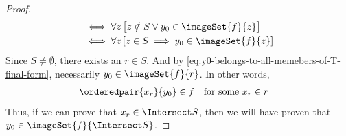 \begin{proof}
\begin{align}
        &\iff
        \forall z \, \big[ z \notin S \lor y_{0} \in \imageSet{f}{z} \big] \notag \\
        &\iff
        \forall z \, \mleft[ z \in S \implies y_{0} \in \imageSet{f}{z} \mright]
    \end{align}
    Since \( S \neq \emptyset \), there exists an \( r \in S \). And by \eqref{eq:y0-belongs-to-all-memebers-of-T-final-form},
    necessarily \( y_{0} \in \imageSet{f}{r} \). In other words,
    \begin{equation}
        \label{eq:fxr-equals-y0}
        \begin{aligned}
            \orderedpair{x_{r}}{y_{0}} \in f &
        \end{aligned}
        \begin{aligned}
            &\text{for some \( x_{r} \in r \)}
        \end{aligned}
    \end{equation}
    Thus, if we can prove that \( x_{r} \in \Intersect S\), then we will have proven that \( y_{0} \in \imageSet{f}{\Intersect S} \).


\end{proof}
